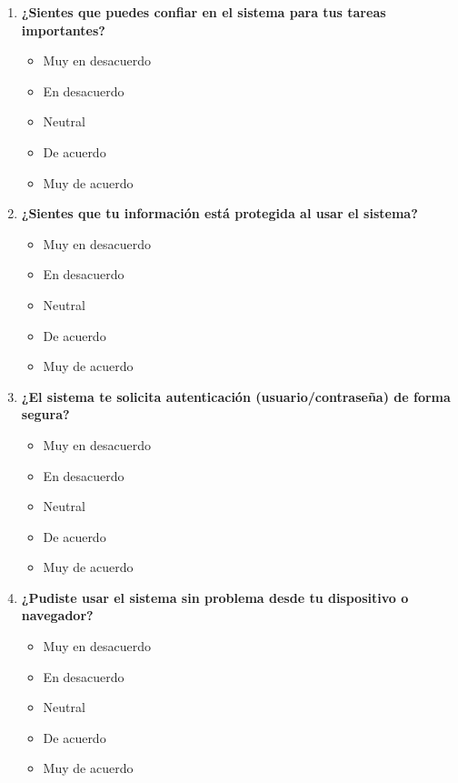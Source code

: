 \documentclass[conference]{IEEEtran}
\begin{document}
\begin{enumerate}
    \item \textbf{¿Sientes que puedes confiar en el sistema para tus tareas importantes?}
        \begin{itemize}
            \item Muy en desacuerdo
            \item En desacuerdo
            \item Neutral
            \item De acuerdo
            \item Muy de acuerdo
        \end{itemize}
        
    \item \textbf{¿Sientes que tu información está protegida al usar el sistema?}
        \begin{itemize}
            \item Muy en desacuerdo
            \item En desacuerdo
            \item Neutral
            \item De acuerdo
            \item Muy de acuerdo
        \end{itemize}
        
    \item \textbf{¿El sistema te solicita autenticación (usuario/contraseña) de forma segura?}
        \begin{itemize}
            \item Muy en desacuerdo
            \item En desacuerdo
            \item Neutral
            \item De acuerdo
            \item Muy de acuerdo
        \end{itemize}
        
    \item \textbf{¿Pudiste usar el sistema sin problema desde tu dispositivo o navegador?}
        \begin{itemize}
            \item Muy en desacuerdo
            \item En desacuerdo
            \item Neutral
            \item De acuerdo
            \item Muy de acuerdo
        \end{itemize}
        

\end{enumerate}
\end{document}
